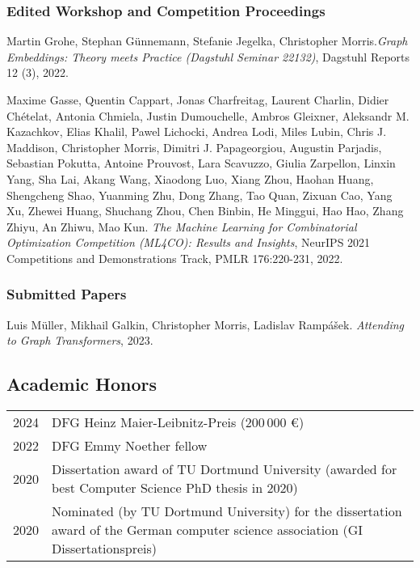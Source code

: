 \documentclass[11pt, a4paper, DIV=14, headings=small]{scrartcl}
\begin{document}
\begin{thebibliography}{15}
		\subsubsection*{Edited Workshop and Competition Proceedings}
		
		Martin Grohe, Stephan Günnemann, Stefanie Jegelka, Christopher Morris.\footnotemark[2]
		\emph{Graph Embeddings: Theory meets Practice (Dagstuhl Seminar 22132)},
		Dagstuhl Reports 12 (3), 2022.
		
		Maxime Gasse, Quentin Cappart, Jonas Charfreitag, Laurent Charlin, Didier Chételat, Antonia Chmiela, Justin Dumouchelle, Ambros Gleixner, Aleksandr M. Kazachkov, Elias Khalil, Pawel Lichocki, Andrea Lodi, Miles Lubin, Chris J. Maddison, Christopher Morris, Dimitri J. Papageorgiou, Augustin Parjadis, Sebastian Pokutta, Antoine Prouvost, Lara Scavuzzo, Giulia Zarpellon, Linxin Yang, Sha Lai, Akang Wang, Xiaodong Luo, Xiang Zhou, Haohan Huang, Shengcheng Shao, Yuanming Zhu, Dong Zhang, Tao Quan, Zixuan Cao, Yang Xu, Zhewei Huang, Shuchang Zhou, Chen Binbin, He Minggui, Hao Hao, Zhang Zhiyu, An Zhiwu, Mao Kun.
		\emph{The Machine Learning for Combinatorial Optimization Competition (ML4CO): Results and Insights}, NeurIPS 2021 Competitions and Demonstrations Track, PMLR 176:220-231, 2022.
		
		\subsubsection*{Submitted Papers}	
		
		Luis Müller, Mikhail Galkin, Christopher Morris, Ladislav Rampášek.
		\emph{Attending to Graph Transformers}, 2023.
	
	\end{thebibliography}
	
	\subsection*{Academic Honors}
	\begin{longtabu}{p{2.1cm}p{12.0cm}}
		2024 & DFG Heinz Maier-Leibnitz-Preis (200\,000 €)
                                                                                                             \\
		2022 & DFG Emmy Noether fellow                                                                                                             \\
		2020 & Dissertation award of TU Dortmund University (awarded for best Computer Science PhD thesis in 2020)                                 \\
		2020 & Nominated (by TU Dortmund University) for the dissertation award of the German computer science association (GI Dissertationspreis) \\
	\end{longtabu}
	
\end{document}
